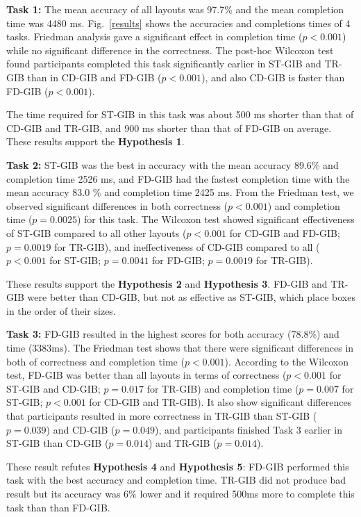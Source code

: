\documentclass{vgtc}                          %
\begin{document}
{\bf Task 1:} The mean accuracy of all layouts was 97.7\% and the mean completion time was 4480 ms.
Fig.~\ref{results} shows the accuracies and completions times of 4 tasks. Friedman analysis gave a significant effect in completion time ($p < 0.001$) while no significant difference in the correctness.
The post-hoc Wilcoxon test found participants completed this task significantly earlier in ST-GIB and TR-GIB than in CD-GIB and FD-GIB ($p<0.001$), and also CD-GIB is faster than FD-GIB ($p<0.001$).

The time required for ST-GIB in this task was about 500 ms shorter than that of CD-GIB and TR-GIB, and 900 ms shorter than that of FD-GIB on average.
These results support the {\bf Hypothesis 1}.

{\bf Task 2:} ST-GIB was the best in accuracy with the mean accuracy 89.6\% and completion time 2526 ms, and FD-GIB had the fastest completion time with the mean accuracy 83.0 \% and completion time 2425 ms.
From the Friedman test, we observed significant differences in both correctness ($p<0.001$) and completion time ($p = 0.0025$) for this task.
The Wilcoxon test showed significant effectiveness of ST-GIB compared to all other layouts ($p<0.001$ for CD-GIB and FD-GIB; $p=0.0019$ for TR-GIB), and ineffectiveness of CD-GIB compared to all ($p<0.001$ for ST-GIB; $p=0.0041$ for FD-GIB; $p=0.0019$ for TR-GIB).

These results support the {\bf Hypothesis 2} and {\bf Hypothesis 3}. FD-GIB and TR-GIB were better than CD-GIB, but not as effective as ST-GIB, which place boxes in the order of their sizes.

{\bf Task 3:} FD-GIB resulted in the highest scores for both accuracy (78.8\%) and time (3383ms).
The Friedman test shows that there were significant differences in both of correctness and completion time ($p<0.001$).
According to the Wilcoxon test, FD-GIB was better than all layouts in terms of correctness ($p<0.001$ for ST-GIB and CD-GIB; $p=0.017$ for TR-GIB) and completion time ($p=0.007$ for ST-GIB; $p<0.001$ for CD-GIB and TR-GIB). It also show significant differences that participants resulted in more correctness in TR-GIB than ST-GIB ($p=0.039$) and CD-GIB ($p=0.049$), and participants finished Task 3 earlier in ST-GIB than CD-GIB ($p=0.014$) and TR-GIB ($p=0.014$).

These result refutes {\bf Hypothesis 4} and {\bf Hypothesis 5}: FD-GIB performed this task with the best accuracy and completion time. TR-GIB did not produce bad result but its accuracy was $6 \%$ lower and it required 500ms more to complete this task than than FD-GIB.
\end{document}
